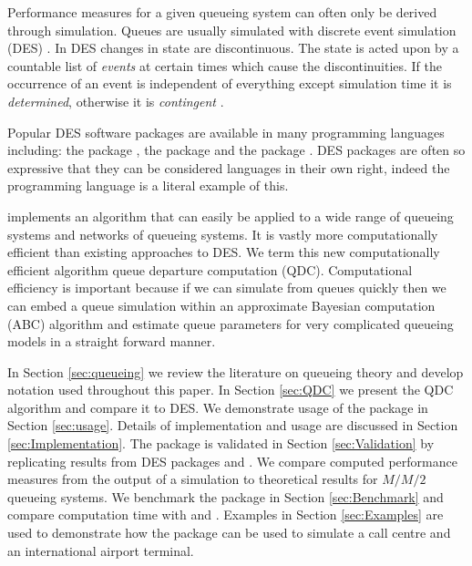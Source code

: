 \documentclass[article]{jss}
\begin{document}
Performance measures for a given queueing system can often only be derived through simulation. Queues are usually simulated with discrete event simulation (DES) \citep[pg. 226]{insua2012bayesian}. In DES changes in state are discontinuous. The state is acted upon by a countable list of \textit{events} at certain times which cause the discontinuities. If the occurrence of an event is independent of everything except simulation time it is \textit{determined}, otherwise it is \textit{contingent} \citep{nance1981time}. 

Popular DES software packages are available in many programming languages including: the  package  \citep{Rpkg_simmer}, the  \citep{van2011python} package  \citep{Ppkg_simpy} and the   \citep{gosling2000java} package  \citep{Jpkg_JMT}. DES packages are often so expressive that they can be considered languages in their own right, indeed the programming language  \citep{dahl1966simula} is a literal example of this. 

 \citep{Rpkg_queuecomputer} implements an algorithm that can easily be applied to a wide range of queueing systems and networks of queueing systems. It is vastly more computationally efficient than existing approaches to DES. We term this new computationally efficient algorithm queue departure computation (QDC). Computational efficiency is important because if we can simulate from queues quickly then we can embed a queue simulation within an approximate Bayesian computation (ABC) algorithm \citep{sunnaker_approximate_2013} and estimate queue parameters for very complicated queueing models in a straight forward manner. 

In Section \ref{sec:queueing} we review the literature on queueing theory and develop notation used throughout this paper. In Section \ref{sec:QDC} we present the QDC algorithm and compare it to DES. We demonstrate usage of the package in Section \ref{sec:usage}. Details of implementation and usage are discussed in Section \ref{sec:Implementation}. The package is validated in Section \ref{sec:Validation} by replicating results from DES packages  and . We compare computed performance measures from the output of a  simulation to theoretical results for $M/M/2$ queueing systems. We benchmark the package in Section \ref{sec:Benchmark} and compare computation time with  and . Examples in Section \ref{sec:Examples} are used to demonstrate how the package can be used to simulate a call centre and an international airport terminal. 
\end{document}
